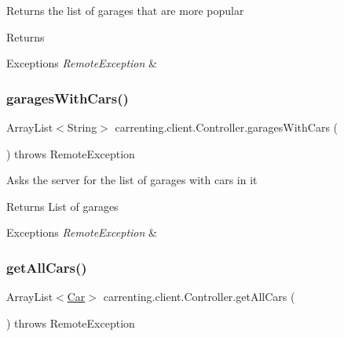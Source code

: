 Returns the list of garages that are more popular

\begin{DoxyReturn}{Returns}

\end{DoxyReturn}

\begin{DoxyExceptions}{Exceptions}
{\em Remote\+Exception} & \\
\hline
\end{DoxyExceptions}
\mbox{\label{classcarrenting_1_1client_1_1_controller_a7131927c67ed8afaed347d3090c0e08b}} 
\subsubsection{\texorpdfstring{garagesWithCars()}{garagesWithCars()}}
{\footnotesize\ttfamily Array\+List$<$String$>$ carrenting.\+client.\+Controller.\+garages\+With\+Cars (\begin{DoxyParamCaption}{ }\end{DoxyParamCaption}) throws Remote\+Exception}

Asks the server for the list of garages with cars in it

\begin{DoxyReturn}{Returns}
List of garages 
\end{DoxyReturn}

\begin{DoxyExceptions}{Exceptions}
{\em Remote\+Exception} & \\
\hline
\end{DoxyExceptions}
\mbox{\label{classcarrenting_1_1client_1_1_controller_a3198f90f6563c389e1f22e52a925ee5d}} 
\subsubsection{\texorpdfstring{getAllCars()}{getAllCars()}}
{\footnotesize\ttfamily Array\+List$<$\mbox{\hyperlink{classcarrenting_1_1server_1_1jdo_1_1_car}{Car}}$>$ carrenting.\+client.\+Controller.\+get\+All\+Cars (\begin{DoxyParamCaption}{ }\end{DoxyParamCaption}) throws Remote\+Exception}


